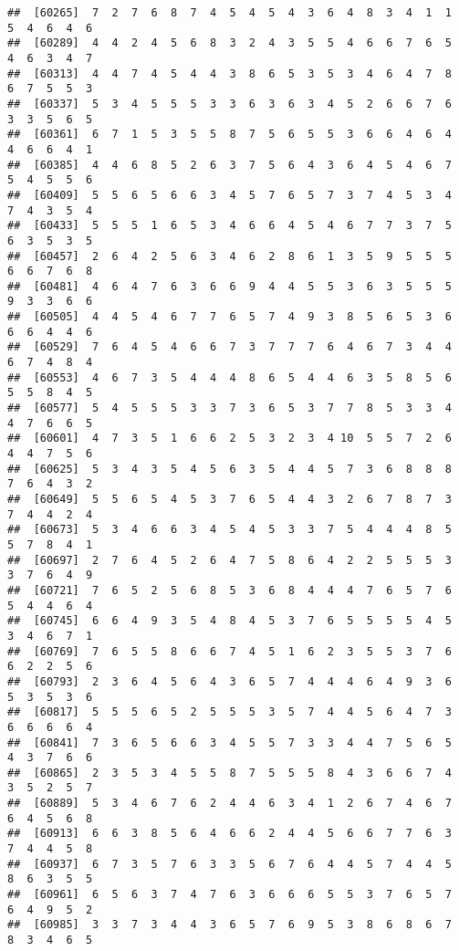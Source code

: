 \documentclass[
]{book}
\begin{document}
\begin{verbatim}
##  [60265]  7  2  7  6  8  7  4  5  4  5  4  3  6  4  8  3  4  1  1  5  4  6  4  6
##  [60289]  4  4  2  4  5  6  8  3  2  4  3  5  5  4  6  6  7  6  5  4  6  3  4  7
##  [60313]  4  4  7  4  5  4  4  3  8  6  5  3  5  3  4  6  4  7  8  6  7  5  5  3
##  [60337]  5  3  4  5  5  5  3  3  6  3  6  3  4  5  2  6  6  7  6  3  3  5  6  5
##  [60361]  6  7  1  5  3  5  5  8  7  5  6  5  5  3  6  6  4  6  4  4  6  6  4  1
##  [60385]  4  4  6  8  5  2  6  3  7  5  6  4  3  6  4  5  4  6  7  5  4  5  5  6
##  [60409]  5  5  6  5  6  6  3  4  5  7  6  5  7  3  7  4  5  3  4  7  4  3  5  4
##  [60433]  5  5  5  1  6  5  3  4  6  6  4  5  4  6  7  7  3  7  5  6  3  5  3  5
##  [60457]  2  6  4  2  5  6  3  4  6  2  8  6  1  3  5  9  5  5  5  6  6  7  6  8
##  [60481]  4  6  4  7  6  3  6  6  9  4  4  5  5  3  6  3  5  5  5  9  3  3  6  6
##  [60505]  4  4  5  4  6  7  7  6  5  7  4  9  3  8  5  6  5  3  6  6  6  4  4  6
##  [60529]  7  6  4  5  4  6  6  7  3  7  7  7  6  4  6  7  3  4  4  6  7  4  8  4
##  [60553]  4  6  7  3  5  4  4  4  8  6  5  4  4  6  3  5  8  5  6  5  5  8  4  5
##  [60577]  5  4  5  5  5  3  3  7  3  6  5  3  7  7  8  5  3  3  4  4  7  6  6  5
##  [60601]  4  7  3  5  1  6  6  2  5  3  2  3  4 10  5  5  7  2  6  4  4  7  5  6
##  [60625]  5  3  4  3  5  4  5  6  3  5  4  4  5  7  3  6  8  8  8  7  6  4  3  2
##  [60649]  5  5  6  5  4  5  3  7  6  5  4  4  3  2  6  7  8  7  3  7  4  4  2  4
##  [60673]  5  3  4  6  6  3  4  5  4  5  3  3  7  5  4  4  4  8  5  5  7  8  4  1
##  [60697]  2  7  6  4  5  2  6  4  7  5  8  6  4  2  2  5  5  5  3  3  7  6  4  9
##  [60721]  7  6  5  2  5  6  8  5  3  6  8  4  4  4  7  6  5  7  6  5  4  4  6  4
##  [60745]  6  6  4  9  3  5  4  8  4  5  3  7  6  5  5  5  5  4  5  3  4  6  7  1
##  [60769]  7  6  5  5  8  6  6  7  4  5  1  6  2  3  5  5  3  7  6  6  2  2  5  6
##  [60793]  2  3  6  4  5  6  4  3  6  5  7  4  4  4  6  4  9  3  6  5  3  5  3  6
##  [60817]  5  5  5  6  5  2  5  5  5  3  5  7  4  4  5  6  4  7  3  6  6  6  6  4
##  [60841]  7  3  6  5  6  6  3  4  5  5  7  3  3  4  4  7  5  6  5  4  3  7  6  6
##  [60865]  2  3  5  3  4  5  5  8  7  5  5  5  8  4  3  6  6  7  4  3  5  2  5  7
##  [60889]  5  3  4  6  7  6  2  4  4  6  3  4  1  2  6  7  4  6  7  6  4  5  6  8
##  [60913]  6  6  3  8  5  6  4  6  6  2  4  4  5  6  6  7  7  6  3  7  4  4  5  8
##  [60937]  6  7  3  5  7  6  3  3  5  6  7  6  4  4  5  7  4  4  5  8  6  3  5  5
##  [60961]  6  5  6  3  7  4  7  6  3  6  6  6  5  5  3  7  6  5  7  6  4  9  5  2
##  [60985]  3  3  7  3  4  4  3  6  5  7  6  9  5  3  8  6  8  6  7  8  3  4  6  5

\end{verbatim}
\end{document}
